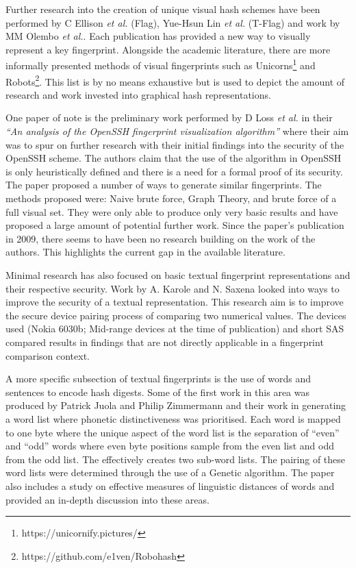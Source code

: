 Further research into the creation of unique visual hash schemes have been performed by C Ellison \textit{et al.} \cite{ellison2003public} (Flag), Yue-Hsun Lin \textit{et al.}\cite{lin2010spate} (T-Flag) and work by MM Olembo \textit{et al.}\cite{olembo2013developing}. Each publication has provided a new way to visually represent a key fingerprint. Alongside the academic literature, there are more informally presented methods of visual fingerprints such as Unicorns\footnote{https://unicornify.pictures/} and Robots\footnote{https://github.com/e1ven/Robohash}. This list is by no means exhaustive but is used to depict the amount of research and work invested into graphical hash representations.

One paper of note is the preliminary work performed by D Loss \textit{et al.}\cite{loss2009drunken} in their \textit{``An analysis of the OpenSSH fingerprint visualization algorithm''} where their aim was to spur on further research with their initial findings into the security of the OpenSSH scheme. The authors claim that the use of the algorithm in OpenSSH is only heuristically defined and there is a need for a formal proof of its security. \\
The paper proposed a number of ways to generate similar fingerprints. The methods proposed were: Naive brute force, Graph Theory, and brute force of a full visual set. They were only able to produce only very basic results and have proposed a large amount of potential further work. Since the paper's publication in 2009, there seems to have been no research building on the work of the authors. This highlights the current gap in the available literature.

Minimal research has also focused on basic textual fingerprint representations and their respective security. Work by A. Karole and N. Saxena\cite{karole2009improving} looked into ways to improve the security of a textual representation. This research aim is to improve the secure device pairing process of comparing two numerical values. The devices used (Nokia 6030b; Mid-range devices at the time of publication) and short SAS compared results in findings that are not directly applicable in a fingerprint comparison context. 

A more specific subsection of textual fingerprints is the use of words and sentences to encode hash digests. Some of the first work in this area was produced by Patrick Juola and Philip Zimmermann 
\cite{juola1996whole} and their work in generating a word list where phonetic distinctiveness was prioritised. Each word is mapped to one byte where the unique aspect of the word list is the separation of ``even'' and ``odd'' words where even byte positions sample from the even list and odd from the odd list. The effectively creates two sub-word lists. The pairing of these word lists were determined through the use of a Genetic algorithm. The paper also includes a study on effective measures of linguistic distances of words and provided an in-depth discussion into these areas.

